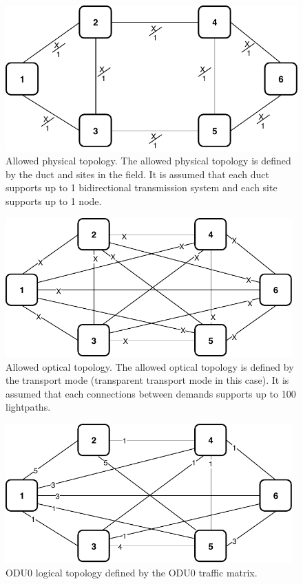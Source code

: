\begin{figure}[h!]
\centering
\includegraphics[width=13cm]{sdf/ilp/transparent_protection/figures/allowed_physical_topology}
\caption{Allowed physical topology. The allowed physical topology is defined by the duct and sites in the field. It is assumed that each duct supports up to 1 bidirectional transmission system and each site supports up to 1 node.}
\label{allowed2_physical_protectionlow}
\end{figure}
\newpage
\begin{figure}[h!]
\centering
\includegraphics[width=11cm]{sdf/ilp/transparent_protection/figures/allowed_optical_topology}
\caption{Allowed optical topology. The allowed optical topology is defined by the transport mode (transparent transport mode in this case). It is assumed that each connections between demands supports up to 100 lightpaths.}
\label{allowed2_optical_protectionlow}
\end{figure}

\begin{figure}[h!]
\centering
\includegraphics[width=11cm]{sdf/ilp/transparent_protection/figures/logical_topology_ODU0_low}
\caption{ODU0 logical topology defined by the ODU0 traffic matrix.}
\label{logical2_ODU0_protectionlow}
\end{figure}


